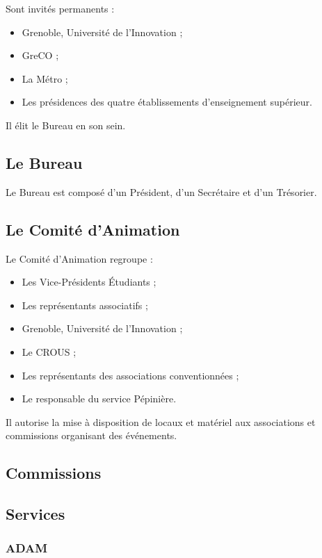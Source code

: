 Sont invités permanents :

\begin{itemize}
\item Grenoble, Université de l'Innovation ;
\item GreCO ;
\item La Métro ;
\item Les présidences des quatre établissements d'enseignement supérieur.
\end{itemize}

Il élit le Bureau en son sein.

\subsection{Le Bureau}

Le Bureau est composé d'un Président, d'un Secrétaire et d'un Trésorier.

\subsection{Le Comité d'Animation}

Le Comité d'Animation regroupe :

\begin{itemize}
\item Les Vice-Présidents Étudiants ;
\item Les représentants associatifs ;
\item Grenoble, Université de l'Innovation ;
\item Le CROUS ;
\item Les représentants des associations conventionnées ;
\item Le responsable du service Pépinière.
\end{itemize}

Il autorise la mise à disposition de locaux et matériel aux associations
et commissions organisant des événements.

\subsection{Commissions}

\subsection{Services}

\subsubsection{ADAM}


